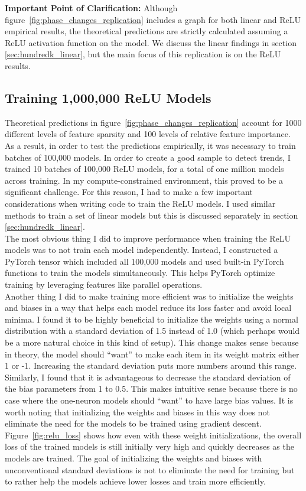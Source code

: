 \documentclass{article} %
\begin{document}
\textbf{Important Point of Clarification:} Although 
figure~\ref{fig:phase_changes_replication} includes a graph for both linear and ReLU
empirical results, the theoretical predictions are strictly calculated assuming
a ReLU activation function on the model. We discuss the linear findings in section
\ref{sec:hundredk_linear}, but the main focus of this replication is on the ReLU results.

\subsection{Training 1,000,000 ReLU Models}
\label{sec:million}

Theoretical predictions in figure~\ref{fig:phase_changes_replication} account
for 1000 different levels of feature sparsity and 100 levels of relative feature
importance. As a result, in order to test the predictions empirically, it was
necessary to train batches of 100,000 models. In order to create a good sample
to detect trends, I trained 10 batches of 100,000 ReLU models, for a total of one million
models across training. In my compute-constrained environment,
this proved to be a significant challenge. For this reason, I had to make a few
important considerations when writing code to train the ReLU models. I used 
similar methods to train a set of linear models but this is discussed separately
in section \ref{sec:hundredk_linear}.\\

The most obvious thing I did to improve performance when training the 
ReLU models was to not train each model independently. Instead, I constructed a 
PyTorch tensor which included all 100,000 models and used built-in PyTorch functions 
to train the models simultaneously. This helps PyTorch optimize training by 
leveraging features like parallel operations. \\

Another thing I did to make training more efficient was to initialize the weights and
biases in a way that helps each model reduce its loss faster and avoid local minima.
I found it to be highly beneficial to initialize the weights using a normal 
distribution with a standard deviation of 1.5 instead of
1.0 (which perhaps would be a more natural choice in this kind of setup). This change
makes sense because 
in theory, the model should ``want'' to make each item in its weight matrix
either 1 or -1. Increasing the standard deviation puts more numbers around this range.
Similarly, I found that it is advantageous to decrease the standard deviation of the
bias parameters from 1 to 0.5. This makes intuitive sense because
there is no case where the one-neuron models should ``want'' to have large bias values.
It is worth noting that initializing the weights and biases in this way does
not eliminate the need for the models to be trained using gradient descent.
Figure~\ref{fig:relu_loss} shows how even with these weight initializations, the
overall loss of the trained models is still initially very high and quickly
decreases as the models are trained. The goal of initializing the weights and biases
with unconventional standard deviations is not to eliminate the need for training
but to rather help the models achieve lower losses and train more efficiently.
\end{document}
